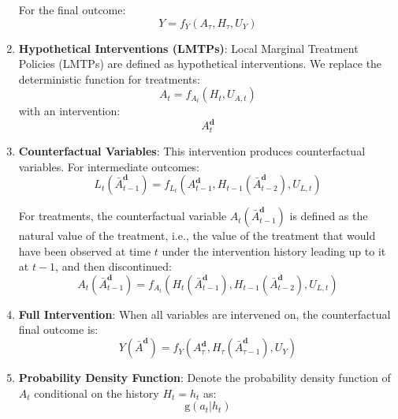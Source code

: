 \documentclass[
  single column]{article}
\begin{document}
\begin{enumerate}
  For the final outcome: \[
  Y = f_{Y}(A_{\tau}, H_{\tau}, U_{Y})
  \]
\item
  \textbf{Hypothetical Interventions (LMTPs)}: Local Marginal Treatment
  Policies (LMTPs) are defined as hypothetical interventions. We replace
  the deterministic function for treatments: \[
  A_t = f_{A_t}(H_t, U_{A,t})
  \] with an intervention: \[
  A^\mathbf{d}_t
  \]
\item
  \textbf{Counterfactual Variables}: This intervention produces
  counterfactual variables. For intermediate outcomes: \[
  L_t(\bar{A}^\mathbf{d}_{t-1}) = f_{L_t}(A^\mathbf{d}_{t-1}, H_{t-1}(\bar{A}^\mathbf{d}_{t-2}), U_{L,t})
  \]

  For treatments, the counterfactual variable
  \(A_t(\bar{A}^\mathbf{d}_{t-1})\) is defined as the natural value of
  the treatment, i.e., the value of the treatment that would have been
  observed at time \(t\) under the intervention history leading up to it
  at \(t-1\), and then discontinued: \[
  A_t(\bar{A}^\mathbf{d}_{t-1}) = f_{A_t}(H_t(\bar{A}^\mathbf{d}_{t-1}), H_{t-1}(\bar{A}^\mathbf{d}_{t-2}), U_{L,t})
  \]
\item
  \textbf{Full Intervention}: When all variables are intervened on, the
  counterfactual final outcome is: \[
  Y(\bar{A}^\mathbf{d}) = f_Y(A^\mathbf{d}_\tau, H_\tau(\bar{A}^\mathbf{d}_{\tau-1}), U_{Y})
  \]
\item
  \textbf{Probability Density Function}: Denote the probability density
  function of \(A_t\) conditional on the history \(H_t = h_t\) as: \[
     \text{g}(a_t|h_t)
     \]
\end{enumerate}

\newpage{}
\end{document}

